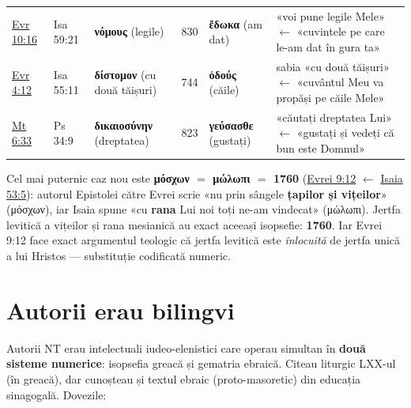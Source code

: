 \documentclass[12pt,a4paper,twoside,openany]{book}
\begin{document}
\begin{center}
\begin{tabularx}{\textwidth}{L{1.5cm}L{1.5cm}L{2.6cm}C{0.7cm}L{2.6cm}X}
\href{https://bibliaortodoxa.ro/carte.php?id=65\&cap=10\#16}{Evr 10:16} & Isa 59:21 & \textbf{νόμους} (legile) & 830 & \textbf{ἔδωκα} (am dat) & «voi pune legile Mele» $\leftarrow$ «cuvintele pe care le-am dat în gura ta» \\
\href{https://bibliaortodoxa.ro/carte.php?id=65\&cap=4\#12}{Evr 4:12} & Isa 55:11 & \textbf{δίστομον} (cu două tăișuri) & 744 & \textbf{ὁδούς} (căile) & sabia «cu două tăișuri» $\leftarrow$ «cuvântul Meu va propăși pe căile Mele» \\
\href{https://bibliaortodoxa.ro/carte.php?id=55\&cap=6\#33}{Mt 6:33} & Ps 34:9 & \textbf{δικαιοσύνην} (dreptatea) & 823 & \textbf{γεύσασθε} (gustați) & «căutați dreptatea Lui» $\leftarrow$ «gustați și vedeți că bun este Domnul» \\
\bottomrule
\end{tabularx}
\end{center}

Cel mai puternic caz nou este \textbf{μόσχων $=$ μώλωπι $=$ 1760} (\href{https://bibliaortodoxa.ro/carte.php?id=65\&cap=9\#12}{Evrei 9:12} $\leftarrow$ \href{https://bibliaortodoxa.ro/carte.php?id=43\&cap=53\#5}{Isaia 53:5}): autorul Epistolei către Evrei scrie «nu prin sângele \textbf{țapilor și vițeilor}» (μόσχων), iar Isaia spune «cu \textbf{rana} Lui noi toți ne-am vindecat» (μώλωπι). Jertfa levitică a vițeilor și rana mesianică au exact aceeași isopsefie: \textbf{1760}. Iar Evrei 9:12 face exact argumentul teologic că jertfa levitică este \textit{înlocuită} de jertfa unică a lui Hristos --- substituție codificată numeric.

\section*{Autorii erau bilingvi}

Autorii NT erau intelectuali iudeo-elenistici care operau simultan în \textbf{două sisteme numerice}: isopsefia greacă și gematria ebraică. Citeau liturgic LXX-ul (în greacă), dar cunoșteau și textul ebraic (proto-masoretic) din educația sinagogală. Dovezile:
\end{document}

